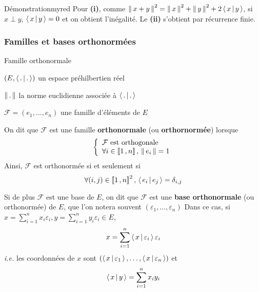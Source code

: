         \begin{demo}{Démonstration}{myred}
            Pour \textbf{(i)}, comme $\left\lVert\,x + y\,\right\rVert^2 =  \left\lVert\,x\,\right\rVert^2 + \left\lVert\,y\,\right\rVert^2 + 2 \left<\,x\,\middle|\,y\,\right>$, si $x \perp y$, $\left<\,x\,\middle|\,y\,\right>= 0$ et on obtient l’inégalité. Le \textbf{(ii)} s’obtient par récurrence finie.
        \end{demo}

        \subsubsection{Familles et bases orthonormées}

        \begin{defitheo}{Famille orthonormale}{}
            \begin{soient}
                \item $(E,\left<\,.\,\middle|\,.\,\right>)$ un espace préhilbertien réel
                \item $\left\lVert\,.\,\right\rVert$ la norme euclidienne associée à $\left<\,.\,\middle|\,.\,\right>$
                \item $\mathcal{F} = (e_1,\ldots, e_n)$ une famille d’éléments de $E$
            \end{soient}
            On dit que $\mathcal{F}$ est une famille \textbf{orthonormale} (ou \textbf{orthornormée}) lorsque 
            \[\et{\mathcal{F} \text{ est orthogonale}}{\forall i \in \intervalleEntier{1}{n}, \, \norm{e_i} = 1} \]
            Ainsi, $\mathcal{F}$ est orthonormée si et seulement si 
            \[ \forall (i,j) \in \left\llbracket 1 \, , n \right\rrbracket^2, \, \left<\,e_i\,\middle|\,e_j\,\right> = \delta_{i,j} \] 
            
            Si de plus $\mathcal{F}$ est une base de $E$, on dit que $\mathcal{F}$ est une \textbf{base orthonormale} (ou orthonormée) de $E$, que l’on notera souvent $(\varepsilon_1,\ldots,\varepsilon_n)$
            Dans ce cas, si $x = \sum_{i=1}^{n} x_i \varepsilon_i, y = \sum_{i=1}^{n} y_i \varepsilon_i \in E$, 
            \[ x = \sum_{i=1}^{n} \left<\,x\,\middle|\,\varepsilon_i\,\right> \varepsilon_i \]   
            \textit{i.e.} les coordonnées de $x$ sont $\left(\left<\,x\,\middle|\,\varepsilon_1\,\right>,\ldots, \left<\,x\,\middle|\,\varepsilon_n\,\right>\right)$ et 
            \[ \left<\,x\,\middle|\,y\,\right> = \sum_{i=1}^{n} x_i y_i \]
        \end{defitheo}

